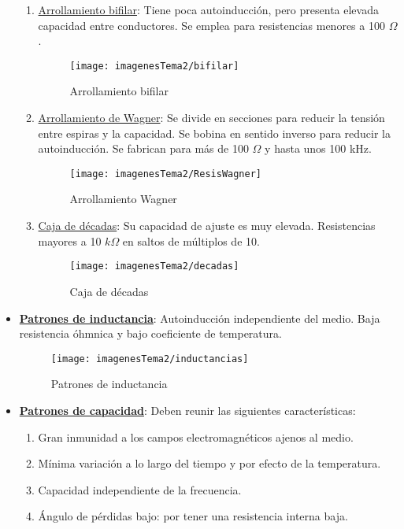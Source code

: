 \begin{itemize}
	\begin{enumerate}
		\item \underline{Arrollamiento bifilar}: Tiene poca autoinducción, pero presenta elevada capacidad entre conductores. Se emplea para resistencias menores a 100 $\Omega$.
		
		\begin{figure}[H]
			\centering
			\texttt{[image: imagenesTema2/bifilar]}
			\caption{Arrollamiento bifilar}
			\label{fig:bifilar}
		\end{figure}
		
		\item \underline{Arrollamiento de Wagner}: Se divide en secciones para reducir la tensión entre espiras y la capacidad. Se bobina en sentido inverso para reducir la autoinducción. Se fabrican para más de 100 $\Omega$ y hasta unos 100 kHz.
		
		\begin{figure}[H]
			\centering
			\texttt{[image: imagenesTema2/ResisWagner]}
			\caption{Arrollamiento Wagner}
			\label{fig:resiswagner}
		\end{figure}
		
		\item \underline{Caja de décadas}: Su capacidad de ajuste es muy elevada. Resistencias mayores a 10 $k\Omega$ en saltos de múltiplos de 10.
		\begin{figure}[H]
			\centering
			\texttt{[image: imagenesTema2/decadas]}
			\caption{Caja de décadas}
			\label{fig:decadas}
		\end{figure}
		
		
	\end{enumerate}
	
	\item \underline{\textbf{Patrones de inductancia}}: Autoinducción independiente del medio. Baja resistencia óhmnica  y bajo coeficiente de temperatura.
	
	\begin{figure}[H]
		\centering
		\texttt{[image: imagenesTema2/inductancias]}
		\caption{Patrones de inductancia}
		\label{fig:inductancias}
	\end{figure}
	
	\item \underline{\textbf{Patrones de capacidad}}: Deben reunir las siguientes características: 
	\begin{enumerate}
		\item Gran inmunidad a los campos electromagnéticos ajenos al medio.
		\item Mínima variación a lo largo del tiempo y por efecto de la temperatura.
		\item Capacidad independiente de la frecuencia.
		\item Ángulo de pérdidas bajo: por tener una resistencia interna baja.
		

\end{enumerate}
\end{itemize}
